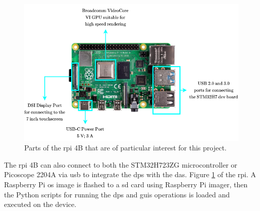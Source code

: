 \documentclass[class=report,11pt,crop=false]{standalone}
\begin{document}
	\begin{figure}[ht!]
		\centering
		\includegraphics[width=0.64\linewidth]{Figures/Methodology/dps-rpi-4b}
		\caption{Parts of the \acrshort{rpi} 4B that are of particular interest for this project.}
		\label{fig:dps-rpi-4b}
	\end{figure} 

	The \acrshort{rpi} 4B can also connect to both the STM32H723ZG microcontroller or Picoscope 2204A via \acrshort{usb} to integrate the \acrshort{dps} with the \acrshort{das}. Figure \ref{fig:dps-rpi-4b} of the \acrshort{rpi}. A Raspberry Pi \acrshort{os} image is flashed to a \acrshort{sd} card using Raspberry Pi imager, then the Python scripts for running the \acrshort{dps} and \acrshort{guis} operations is loaded and executed on the device. 
	
\end{document}
